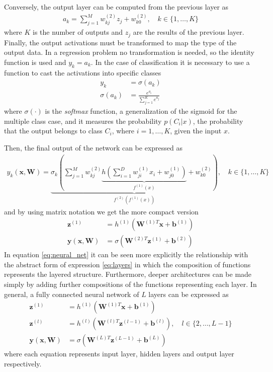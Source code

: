 Conversely, the output layer can be computed from the previous layer as
\begin{align*}
    a_k = \sum^M_{j=1}w^{(2)}_{kj}z_j+w^{(2)}_{k0}, \quad k \in \{1,\ldots, K\}
\end{align*}
where $K$ is the number of outputs and $z_j$ are the results of the previous layer. Finally, the output activations must be transformed to map the type of the output data. In a regression problem no transformation is needed, so the identity function is used and $y_k = a_k$. In the case of classification it is necessary to use a function to cast the activations into specific classes
\begin{align*}
    y_k &= \sigma (a_k)\\
    \sigma(a_k) &= \frac{e^{a_i}}{\sum^K_{j=1}e^{a_j}}
\end{align*}
where $\sigma(\cdot)$ is the \textit{softmax} function, a generalization of the sigmoid for the multiple class case, and it measures the probability $p(C_i|x)$, the probability that the output belongs to class $C_i$,  where $i=1,\ldots, K$, given the input $x$.

Then, the final output of the network can be expressed as 
\begin{align}
    y_k(\mathbf{x},\mathbf{W}) = \underbrace{\sigma_k \left(\sum^M_{j=1}w^{(2)}_{kj}\underbrace{h\left(\sum^D_{i=1}w^{(1)}_{ji}x_i+w^{(1)}_{j0}\right)}_{f^{(1)}(x)}+w^{(2)}_{k0}\right)}_{f^{(2)}(f^{(1)}(x))}, \quad k \in \{1,\ldots, K\}
    \label{eq:neural_net}
\end{align}
and by using matrix notation we get the more compact version
\begin{align*}
    \mathbf{z}^{(1)} &= h^{(1)}\left(\mathbf{W}^{(1)T}\mathbf{x} + \mathbf{b}^{(1)}\right) \\
    \mathbf{y}(\mathbf{x},\mathbf{W})&= \sigma\left(\mathbf{W}^{(2)T}\mathbf{z}^{(1)} + \mathbf{b}^{(2)}\right)
\end{align*}
In equation \eqref{eq:neural_net} it can be seen more explicitly the relationship with the abstract form of expression \eqref{eq:layers} in which the composition of functions represents the layered structure. Furthermore, deeper architectures can be made simply by adding further compositions of the functions representing each layer. In general, a fully connected neural network of $L$ layers can be expressed as
\begin{align*}
    \mathbf{z}^{(1)} &= h^{(1)}\left(\mathbf{W}^{(1)T}\mathbf{x} + \mathbf{b}^{(1)}\right) \\
    \mathbf{z}^{(l)} &= h^{(l)}\left(\mathbf{W}^{(l)T}\mathbf{z}^{(l-1)} + \mathbf{b}^{(l)}\right), \quad l \in \{2,\ldots, L-1 \} \\
    \mathbf{y}(\mathbf{x}, \mathbf{W})  &=\sigma\left(\mathbf{W}^{(L)T}\mathbf{z}^{(L-1)} + \mathbf{b}^{(L)}\right) 
\end{align*}
where each equation represents input layer, hidden layers and output layer respectively.

